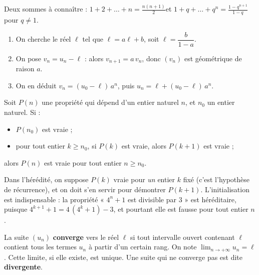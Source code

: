 \vspace{2mm}
Deux sommes à connaître :\quad
$\displaystyle 1+2+\dots+n=\frac{n(n+1)}{2}$\qquad et\qquad
$\displaystyle 1+q+\dots+q^{n}=\frac{1-q^{n+1}}{1-q}$\enspace pour $q\neq1$.

\begin{savoirfaire}[Suite arithmético-géométrique $u_{n+1}=a\,u_n+b$, avec $a\neq1$]
\begin{enumerate}[label=\otLabel{\arabic*.},leftmargin=1.6em,itemsep=0.6mm,topsep=0.5mm]
  \item On cherche le réel $\ell$ tel que $\ell=a\ell+b$, soit $\ell=\dfrac{b}{1-a}$.
  \item On pose $v_n=u_n-\ell$ : alors $v_{n+1}=a\,v_n$, donc $(v_n)$ est géométrique de raison $a$.
  \item On en déduit $v_n=(u_0-\ell)\,a^{n}$, puis $u_n=\ell+(u_0-\ell)\,a^{n}$.
\end{enumerate}
\end{savoirfaire}


\begin{theoreme}
Soit $P(n)$ une propriété qui dépend d'un entier naturel $n$, et $n_0$ un entier naturel. Si :
\begin{itemize}[label={\color{otNavy}\textbullet},leftmargin=1.4em,itemsep=0.6mm,topsep=0.8mm]
  \item {} $P(n_0)$ est vraie ;
  \item {} pour tout entier $k\geq n_0$, si $P(k)$ est vraie, alors $P(k+1)$ est vraie ;
\end{itemize}
alors $P(n)$ est vraie pour tout entier $n\geq n_0$.
\end{theoreme}

\begin{attention}
Dans l'hérédité, on suppose $P(k)$ vraie pour \emph{un} entier $k$ fixé (c'est l'hypothèse de
récurrence), et on doit s'en servir pour démontrer $P(k+1)$. L'initialisation est indispensable :
la propriété « $4^{n}+1$ est divisible par $3$ » est héréditaire, puisque
$4^{k+1}+1=4\,(4^{k}+1)-3$, et pourtant elle est fausse pour tout entier $n$.
\end{attention}


\begin{definition}
La suite $(u_n)$ \textbf{converge} vers le réel $\ell$ si tout intervalle ouvert contenant $\ell$
contient tous les termes $u_n$ à partir d'un certain rang. On note $\displaystyle\lim_{n\to+\infty}u_n=\ell$.
Cette limite, si elle existe, est unique. Une suite qui ne converge pas est dite \textbf{divergente}.
\end{definition}

